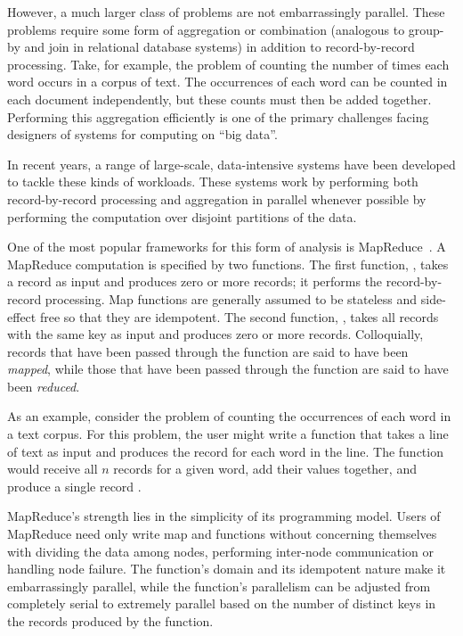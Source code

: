 However, a much larger class of problems are not embarrassingly parallel. These
problems require some form of aggregation or combination (analogous to group-by
and join in relational database systems) in addition to record-by-record
processing. Take, for example, the problem of counting the number of times each
word occurs in a corpus of text. The occurrences of each word can be counted in
each document independently, but these counts must then be added
together. Performing this aggregation efficiently is one of the primary
challenges facing designers of systems for computing on ``big data''.

In recent years, a range of large-scale, data-intensive systems have been
developed to tackle these kinds of workloads.  These systems work by
performing both record-by-record processing and aggregation in parallel whenever
possible by performing the computation over disjoint partitions of the
data.

One of the most popular frameworks for this form of analysis is
MapReduce~\cite{mapreduce}. A MapReduce computation is specified by two
functions. The first function, \map, takes a record as input and produces
zero or more records; it performs the record-by-record processing. Map
functions are generally assumed to be stateless and side-effect free so that
they are idempotent. The second function, \reduce, takes all records with
the same key as input and produces zero or more records. Colloquially, records
that have been passed through the \map function are said to have been
\emph{mapped}, while those that have been passed through the \reduce function
are said to have been \emph{reduced}.

As an example, consider the problem of counting the occurrences of each word in
a text corpus. For this problem, the user might write a \map function that takes
a line of text as input and produces the record  for each word
in the line. The \reduce function would receive all $n$ records for a given
word, add their values together, and produce a single record .

MapReduce's strength lies in the simplicity of its programming model. Users of
MapReduce need only write map and \reduce functions without concerning
themselves with dividing the data among nodes, performing inter-node
communication or handling node failure. The \map function's domain and its
idempotent nature make it embarrassingly parallel, while the \reduce function's
parallelism can be adjusted from completely serial to extremely parallel based
on the number of distinct keys in the records produced by the \map function.

